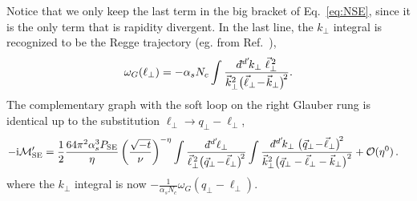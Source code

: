 \documentclass[letterpaper,11pt]{article}
\newcommand{\eq}[1]{Eq.~\eqref{eq:#1}}
\newcommand{\img}{\mathrm{i}}
\newcommand{\cM}{\mathcal{M}}
\newcommand{\as}{\alpha_s}
\newcommand\prp[1]{\vec #1_\perp}
\newcommand\prpsq[1]{\vec{#1}^{2}_\perp}
\newcommand\prpsqm[2]{\bigl( \prp{#1} \!-\! \prp{#2} \bigr)^{\!2}}
\newcommand{\dbar}{d\hspace*{-0.08em}\bar{}\hspace*{0.1em}}
\begin{document}
Notice that we only keep the last term in the big bracket of \eq{NSE}, since it is the only term that is rapidity divergent.
In the last line, the $k_\perp$ integral is recognized to be the Regge trajectory (eg. from Ref.~\cite{Kovchegov:2012mbw}),
%
\begin{align}
    \omega_G(\ell_\perp) = -\as N_c \int \frac{\dbar^{d'}\!k_\perp \; \vec\ell_\perp^{\,2}}{\prpsq{k} \prpsqm{\ell}{k}} . 
\end{align}
% 
The complementary graph with the soft loop on the right Glauber rung is identical up to the substitution $\ell_\perp \to q_\perp-\ell_\perp$,
%
\begin{align}
-\img\cM_{\rm SE}' &= \frac12 \frac{64 \pi^2 \as^3 P_\text{SE}}{\eta}  \left(\frac{\sqrt{-t}}{\nu}\right)^{-\eta} \int\frac{\dbar^{d'}\!\ell_\perp}{
\vec\ell_\perp^{\,2} \prpsqm{q}{\ell}
} \int \frac{\dbar^{d'}\!k_\perp \; \prpsqm{q}{\ell}}{\prpsq{k} \bigl(\prp{q}- \prp{\ell}  - \prp{k} \bigr)^2} + \mathcal{O}(\eta^0)
\,.
\label{eq:SoftEyeFlip}
\end{align}
%
where the $k_\perp$ integral is now $-\frac1{\as N_c} \omega_G(q_\perp-\ell_\perp)$. 
\end{document}
